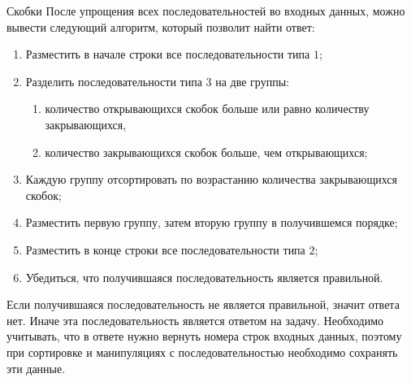 \begin{tutorial}{Скобки}
После упрощения всех последовательностей во входных данных, можно вывести следующий алгоритм, который позволит найти ответ:
\begin{enumerate}
  \item Разместить в начале строки все последовательности типа $1$;
  \item Разделить последовательности типа $3$ на две группы:
  \begin{enumerate}
    \item количество открывающихся скобок больше или равно количеству закрывающихся,
    \item количество закрывающихся скобок больше, чем открывающихся;
  \end{enumerate}
  \item Каждую группу отсортировать по возрастанию количества закрывающихся скобок;
  \item Разместить первую группу, затем вторую группу в получившемся порядке;
  \item Разместить в конце строки все последовательности типа $2$;
  \item Убедиться, что получившаяся последовательность является правильной.
\end{enumerate}

Если получившаяся последовательность не является правильной, значит ответа нет. Иначе эта последовательность является ответом на задачу. Необходимо учитывать, что в ответе нужно вернуть номера строк входных данных, поэтому при сортировке и манипуляциях с последовательностью необходимо сохранять эти данные.

\end{tutorial}
